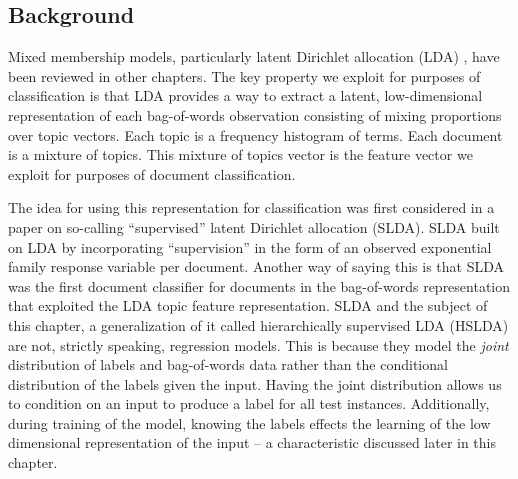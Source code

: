 \subsection{Background}

Mixed membership models, particularly latent Dirichlet allocation (LDA) \cite{Blei2003}, have been reviewed in other chapters.   The key property we exploit for purposes of classification is that LDA %
provides a way to extract a latent, low-dimensional representation of each bag-of-words observation consisting of mixing proportions over topic vectors.  Each topic is a frequency histogram of terms.  Each document is a mixture of topics.  This mixture of topics vector is the feature vector we exploit for purposes of document classification.  


The idea for using this representation for classification was first considered in a paper on so-calling ``supervised'' latent Dirichlet allocation (SLDA).  SLDA built on LDA by incorporating
``supervision'' in the form of an observed exponential family response 
variable per document.  Another way of saying this is that SLDA was the first document classifier for documents in the bag-of-words representation that exploited the LDA topic feature representation.  
 SLDA and the subject of this chapter, a generalization of it called hierarchically supervised LDA (HSLDA) \cite{Perotte-2012-NIPS} are not, strictly speaking, regression models.  This is because they model the {\em joint} distribution of labels and bag-of-words data rather than the conditional distribution of the labels given the input.   Having the joint distribution allows us to condition on an input to produce a label for all test instances.  Additionally, during training of the model, knowing the labels effects the learning of the low dimensional representation of the input -- a characteristic discussed later in this chapter.


